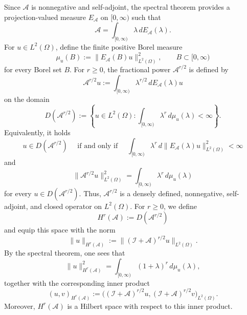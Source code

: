 \documentclass[a4paper,11pt]{article} %
\theoremstyle{remark}
\theoremstyle{definition}
\numberwithin{equation}{section}
\begin{document}
Since \(\mathcal{A}\) is nonnegative and self-adjoint, the spectral theorem provides a projection-valued measure \(E_\mathcal{A}\) on \([0,\infty)\) such that
\begin{equation*}
\mathcal{A}
=
\int_{[0,\infty)}
\lambda\,dE_\mathcal{A}(\lambda).
\end{equation*}
For \(u\in L^2(\Omega)\), define the finite positive Borel measure
\[
\mu_u(B)
:=
\big\|E_\mathcal{A}(B)u\big\|_{L^2(\Omega)}^2,
\qquad
B\subset[0,\infty)
\]
for every Borel set \(B\). For \(r\ge0\), the fractional power
\(\mathcal{A}^{r/2}\) is defined by
\begin{equation*}
\mathcal{A}^{r/2}u
:=
\int_{[0,\infty)}
\lambda^{r/2}\,dE_\mathcal{A}(\lambda)u
\end{equation*}
on the domain
\begin{equation*}
D(\mathcal{A}^{r/2})
:=
\left\{
u\in L^2(\Omega):
\int_{[0,\infty)}
\lambda^r\,d\mu_u(\lambda)<\infty
\right\}.
\end{equation*}
Equivalently, it holds
\[
u\in D(\mathcal{A}^{r/2})
\quad\text{ if and only if }\quad
\int_{[0,\infty)}
\lambda^r
\,d\|E_\mathcal{A}(\lambda)u\|_{L^2(\Omega)}^2
<\infty
\]
and
\begin{equation*}
\big\|\mathcal{A}^{r/2}u\big\|_{L^2(\Omega)}^2
=
\int_{[0,\infty)}
\lambda^r\,d\mu_u(\lambda)
\end{equation*}
for every \(u\in D(\mathcal{A}^{r/2})\). Thus, \(\mathcal{A}^{r/2}\) is a densely defined, nonnegative, self-adjoint, and closed operator on \(L^2(\Omega)\). For \(r\ge0\), we define
\begin{equation*}
H^r(\mathcal{A})
:=
D(\mathcal{A}^{r/2})
\end{equation*}
and equip this space with the norm
\begin{equation*}
\|u\|_{H^r(\mathcal{A})}
:=
\|(\mathcal{I}+\mathcal{A})^{r/2}u\|_{L^2(\Omega)}.
\end{equation*}
By the spectral theorem, one sees that
\begin{equation*}
\|u\|_{H^r(\mathcal{A})}^2
=
\int_{[0,\infty)}
(1+\lambda)^r\,d\mu_u(\lambda),
\end{equation*}
together with the corresponding inner product
\begin{equation*}
(u,v)_{H^r(\mathcal{A})}
:=
\Big(
(\mathcal{I}+\mathcal{A})^{r/2}u,
(\mathcal{I}+\mathcal{A})^{r/2}v
\Big)_{L^2(\Omega)}.
\end{equation*}
Moreover, \(H^r(\mathcal{A})\) is a Hilbert space with respect to this inner product. 
\end{document}
